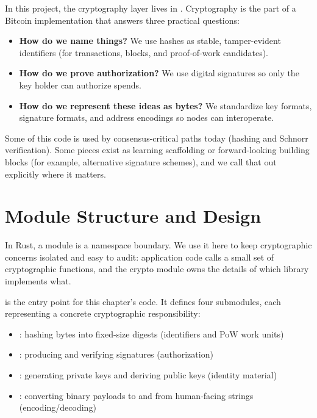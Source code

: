 In this project, the cryptography layer lives in . Cryptography is the part of a Bitcoin implementation that answers three practical questions:

\begin{itemize}
  \item \textbf{How do we name things?} We use hashes as stable, tamper-evident identifiers (for transactions, blocks, and proof-of-work candidates).
  \item \textbf{How do we prove authorization?} We use digital signatures so only the key holder can authorize spends.
  \item \textbf{How do we represent these ideas as bytes?} We standardize key formats, signature formats, and address encodings so nodes can interoperate.
\end{itemize}

Some of this code is used by consensus-critical paths today (hashing and Schnorr verification). Some pieces exist as learning scaffolding or forward-looking building blocks (for example, alternative signature schemes), and we call that out explicitly where it matters.

\section{Module Structure and Design}
\label{sec:ch08-module-structure}

In Rust, a module is a namespace boundary. We use it here to keep cryptographic concerns isolated and easy to audit: application code calls a small set of cryptographic functions, and the crypto module owns the details of which library implements what.

 is the entry point for this chapter's code. It defines four submodules, each representing a concrete cryptographic responsibility:

\begin{itemize}
  \item \textbf{}: hashing bytes into fixed-size digests (identifiers and PoW work units)
  \item \textbf{}: producing and verifying signatures (authorization)
  \item \textbf{}: generating private keys and deriving public keys (identity material)
  \item \textbf{}: converting binary payloads to and from human-facing strings (encoding/decoding)
\end{itemize}

